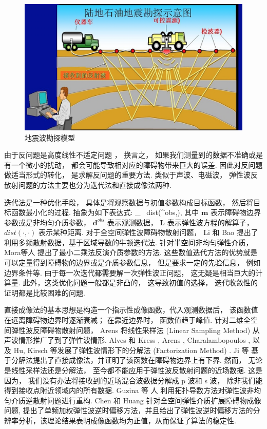 \begin{figure}[htbp]
	\centering
	\includegraphics[width=\textwidth]{./Img/seismic2}
	\caption{地震波勘探模型} \label{figure_seismic}
\end{figure}


由于反问题是高度线性不适定问题 \cite{hadamard1923lectures}， 换言之， 如果我们测量到的数据不准确或是有一个微小的扰动， 都会可能导致相对应的障碍物带来巨大的误差. 因此对反问题做适当形式的转化， 是求解反问题的重要方法. 类似于声波、电磁波， 弹性波反散射问题的方法主要也分为迭代法和直接成像法两种.  

迭代法是一种优化手段， 具体是将观察数据与初值参数构成目标函数， 然后将目标函数最小化的过程.  抽象为如下表达式:
\ben
\min_{} \ dist(^{obs},),
\een
其中 $\mathbf m$ 表示障碍物边界参数或是非均匀介质参数， $\mathbf{d}^{obs}$ 表示观测数据， $\mathbf{{L}}$ 表示弹性波方程的解算子， $dist(\cdot,\cdot)$ 表示某种距离. 
对于全空间弹性波障碍物散射问题， Li \cite{li2016inverse} 和 Bao \cite{bao2018direct} 提出了利用多频散射数据，基于区域导数的牛顿迭代法.  针对半空间非均匀弹性介质， Mora等人 \cite{mora1987nonlinear,feng2017elastic,elita2018elastic} 提出了最小二乘法反演介质参数的方法.  这些数值迭代方法的优势就是可以定量得到障碍物的边界或是介质参数信息， 但是要求一定的先验信息， 例如边界条件等.  由于每一次迭代都需要解一次弹性波正问题， 这无疑是相当巨大的计算量.  此外，这类优化问题一般都是非凸的， 这导致初值的选择， 迭代收敛性的证明都是比较困难的问题.  

直接成像法的基本思想是构造一个指示性成像函数，代入观测数据后， 该函数值在远离障碍物边界时逐渐衰减； 在靠近边界时， 函数值趋于峰值. 针对二维全空间弹性波反障碍物散射问题， Arens \cite{arens2001linear} 将线性采样法 (Linear Sampling Method) 从声波情形推广了到了弹性波情形.   Alves 和 Kress \cite{alves2002far}, Arens \cite{arens2001linear}, Charalambopoulos \cite{charalambopoulos2006factorization}, 以及  Hu, Kirsch \cite{hu2012some} 等发展了弹性波情形下的分解法 (Factorization Method) .  Ji 等 \cite{ji2018direct} 基于分解法提出了直接成像法，并证明了该函数在障碍物边界上有下界.  然而， 无论是线性采样法还是分解法， 至今都不能应用于弹性波反散射问题的近场数据. 这是因为， 我们没有办法将接收到的近场混合波数据分解成 p 波和 s 波， 除非我们能得到接收点附近领域内的所有数据.  Guzina 等
人 \cite{gintides2012identification} 利用拓扑导数方法对弹性波非均匀介质逆散射问题进行重构.  Chen 和 Huang \cite{ela_reverse} 针对全空间弹性介质扩展障碍物成像问题, 提出了单频加权弹性波逆时偏移方法，并且给出了弹性波逆时偏移方法的分辨率分析，该理论结果表明成像函数均为正值，从而保证了算法的稳定性. 

